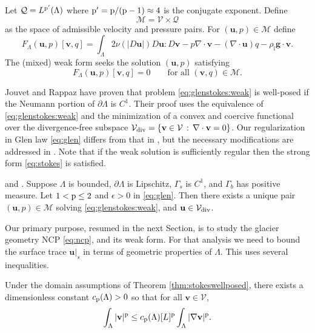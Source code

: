 \documentclass[hidelinks,onefignum,onetabnum,final]{siamart220329}  %
\newcommand{\eps}{\epsilon}
\newcommand{\grad}{\nabla}
\newcommand{\Div}{\nabla\cdot}
\newcommand{\bg}{\mathbf{g}}
\newcommand{\bu}{\mathbf{u}}
\newcommand{\bv}{\mathbf{v}}
\newcommand{\cQ}{\mathcal{Q}}
\newcommand{\cV}{\mathcal{V}}
\newcommand{\pp}{{\text{\textnormal{p}}}}
\newcommand{\rhoi}{\rho_{\text{i}}}
\newcommand{\Vdiv}{\cV_{\text{\textnormal{div}}}}
\begin{document}
Let $\cQ=L^{\pp'}(\Lambda)$ where $\pp'=\pp/(\pp-1)\approx 4$ is the conjugate exponent.  Define
\begin{equation}
\mathcal{M} = \cV \times \cQ \label{eq:glenstokes:mixedspace}
\end{equation}
as the space of admissible velocity and pressure pairs.  For $(\bu,p) \in \mathcal{M}$ define
\begin{equation}
F_\Lambda(\bu,p)[\bv,q] = \int_\Lambda 2 \nu(|D\bu|) D\bu : D\bv - p \Div\bv - (\Div\bu) q - \rhoi \bg \cdot \bv. \label{eq:glenstokes:fcnl}
\end{equation}
The (mixed) weak form seeks the solution $(\bu,p)$ satisfying
\begin{equation}
F_\Lambda(\bu,p)[\bv,q] = 0 \qquad \text{for all } (\bv,q) \in \mathcal{M}. \label{eq:glenstokes:weak}
\end{equation}

Jouvet and Rappaz \cite{JouvetRappaz2011} have proven that problem \eqref{eq:glenstokes:weak} is well-posed if the Neumann portion of $\partial\Lambda$ is $C^1$.  Their proof uses the equivalence of \eqref{eq:glenstokes:weak} and the minimization of a convex and coercive functional over the divergence-free subspace $\Vdiv = \{\bv\in\cV\,:\,\Div\bv=0\}$.  Our regularization in Glen law \eqref{eq:glen} differs from that in \cite{JouvetRappaz2011}, but the necessary modifications are addressed in \cite{IsaacStadlerGhattas2015}.  Note that if the weak solution is sufficiently regular then the strong form \eqref{eq:stokes} is satisfied.

\begin{theorem} \label{thm:stokeswellposed} \cite[Theorem 3.10]{JouvetRappaz2011} and \cite[Appendix A]{IsaacStadlerGhattas2015}.  Suppose $\Lambda$ is bounded, $\partial\Lambda$ is Lipschitz, $\Gamma_s$ is $C^1$, and $\Gamma_b$ has positive measure.  Let $1<\pp\le 2$ and $\eps>0$ in \eqref{eq:glen}.  Then there exists a unique pair $(\bu,p) \in \mathcal{M}$ solving \eqref{eq:glenstokes:weak}, and $\bu\in \Vdiv$.
\end{theorem}

Our primary purpose, resumed in the next Section, is to study the glacier geometry NCP \eqref{eq:ncp}, and its weak form.  For that analysis we need to bound the surface trace $\bu|_s$ in terms of geometric properties of $\Lambda$.  This uses several inequalities.

\begin{lemma} \label{lem:poincare}
Under the domain assumptions of Theorem \ref{thm:stokeswellposed}, there exists a dimensionless constant $c_{\pp}(\Lambda)>0$ so that for all $\bv \in \cV$,
\begin{equation}
\int_\Lambda |\bv|^\pp \le c_{\pp}(\Lambda) [L]^\pp \int_\Lambda |\grad\bv|^\pp. \label{eq:poincare}
\end{equation}
\end{lemma}
\end{document}
